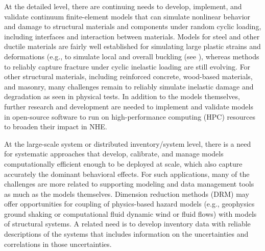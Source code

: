 At the detailed level, there are continuing needs to develop, implement, and validate continuum finite-element models that can simulate nonlinear behavior and damage to structural materials and components under random cyclic loading, including interfaces and interaction between materials. Models for steel and other ductile materials are fairly well established for simulating large plastic strains and deformations (e.g., to simulate local and overall buckling (see \cite{n.i.s.t.-a.t.c.2018blind}), whereas methods to reliably capture fracture under cyclic inelastic loading are still evolving. For other structural materials, including reinforced concrete, wood-based materials, and masonry, many challenges remain to reliably simulate inelastic damage and degradation as seen in physical tests. In addition to the models themselves, further research and development are needed to implement and validate models in open-source software to run on high-performance computing (HPC) resources to broaden their impact in NHE.

At the large-scale system or distributed inventory/system level, there is a need for systematic approaches that develop, calibrate, and manage models computationally efficient enough to be deployed at scale, which also capture accurately the dominant behavioral effects. For such applications, many of the challenges are more related to supporting modeling and data management tools as much as the models themselves. Dimension reduction methods (DRM) may offer opportunities for coupling of physics-based hazard models (e.g., geophysics ground shaking or computational fluid dynamic wind or fluid flows) with models of structural systems. A related need is to develop inventory data with reliable descriptions of the systems that includes information on the uncertainties and correlations in those uncertainties.

